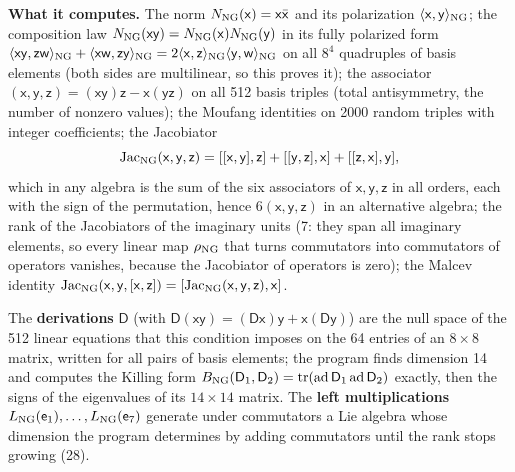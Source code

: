 \documentclass[
  10pt,
]{article}
\begin{document}
\textbf{What it computes.} The norm
\(N_{\rm NG}(\mathsf x)=\mathsf x\bar{\mathsf x}\) and its polarization
\(\langle\mathsf x,\mathsf y\rangle_{\rm NG}\); the composition law
\(N_{\rm NG}(\mathsf x\mathsf y)=N_{\rm NG}(\mathsf x)N_{\rm NG}(\mathsf y)\)
in its fully polarized form
\(\langle\mathsf x\mathsf y,\mathsf z\mathsf w\rangle_{\rm NG}+\langle\mathsf x\mathsf w,\mathsf z\mathsf y\rangle_{\rm NG}=2\langle\mathsf x,\mathsf z\rangle_{\rm NG}\langle\mathsf y,\mathsf w\rangle_{\rm NG}\)
on all \(8^4\) quadruples of basis elements (both sides are multilinear,
so this proves it); the associator
\((\mathsf x,\mathsf y,\mathsf z)=(\mathsf x\mathsf y)\mathsf z-\mathsf x(\mathsf y\mathsf z)\)
on all 512 basis triples (total antisymmetry, the number of nonzero
values); the Moufang identities on 2000 random triples with integer
coefficients; the Jacobiator
\[\mathrm{Jac}_{\rm NG}(\mathsf x,\mathsf y,\mathsf z)=[[\mathsf x,\mathsf y],\mathsf z]+[[\mathsf y,\mathsf z],\mathsf x]+[[\mathsf z,\mathsf x],\mathsf y],\]
which in any algebra is the sum of the six associators of
\(\mathsf x,\mathsf y,\mathsf z\) in all orders, each with the sign of
the permutation, hence \(6(\mathsf x,\mathsf y,\mathsf z)\) in an
alternative algebra; the rank of the Jacobiators of the imaginary units
(7: they span all imaginary elements, so every linear map
\(\rho_{\rm NG}\) that turns commutators into commutators of operators
vanishes, because the Jacobiator of operators is zero); the Malcev
identity
\(\mathrm{Jac}_{\rm NG}(\mathsf x,\mathsf y,[\mathsf x,\mathsf z])=[\mathrm{Jac}_{\rm NG}(\mathsf x,\mathsf y,\mathsf z),\mathsf x]\).

The \textbf{derivations} \(\mathsf D\) (with
\(\mathsf D(\mathsf x\mathsf y)=(\mathsf D\mathsf x)\mathsf y+\mathsf x(\mathsf D\mathsf y)\))
are the null space of the 512 linear equations that this condition
imposes on the 64 entries of an \(8\times8\) matrix, written for all
pairs of basis elements; the program finds dimension 14 and computes the
Killing form
\(B_{\rm NG}(\mathsf D_1,\mathsf D_2)=\mathrm{tr}(\mathrm{ad}\,\mathsf D_1\,\mathrm{ad}\,\mathsf D_2)\)
exactly, then the signs of the eigenvalues of its \(14\times14\) matrix.
The \textbf{left multiplications}
\(L_{\rm NG}(\mathsf e_1),\dots, L_{\rm NG}(\mathsf e_7)\) generate
under commutators a Lie algebra whose dimension the program determines
by adding commutators until the rank stops growing (28).
\end{document}
